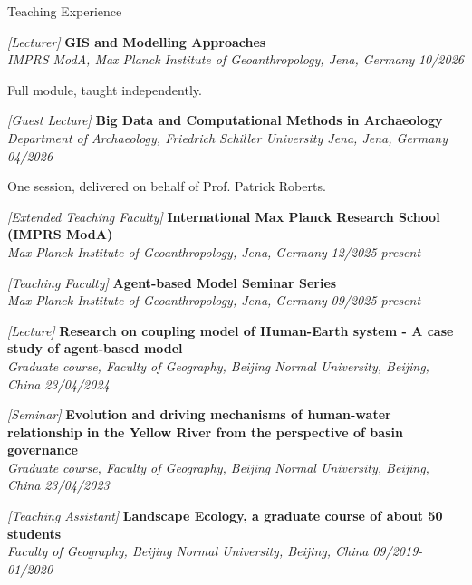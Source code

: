 \documentclass{resume} %
\newcommand{\projectentry}[4]{\textit{[#1]} {\bf #2} \\ \textnormal{\em #3} \hfill {\em #4}}
\begin{document}
\begin{rSection}{Teaching Experience}

    \projectentry{Lecturer}{GIS and Modelling Approaches}{IMPRS ModA, Max Planck Institute of Geoanthropology, Jena, Germany}{10/2026}

    Full module, taught independently.

    \projectentry{Guest Lecture}{Big Data and Computational Methods in Archaeology}{Department of Archaeology, Friedrich Schiller University Jena, Jena, Germany}{04/2026}

    One session, delivered on behalf of Prof. Patrick Roberts.

    \projectentry{Extended Teaching Faculty}{International Max Planck Research School (IMPRS ModA)}{Max Planck Institute of Geoanthropology, Jena, Germany}{12/2025-present}

    \projectentry{Teaching Faculty}{Agent-based Model Seminar Series}{Max Planck Institute of Geoanthropology, Jena, Germany}{09/2025-present}

    \projectentry{Lecture}{Research on coupling model of Human-Earth system - A case study of agent-based model}{Graduate course, Faculty of Geography, Beijing Normal University, Beijing, China}{23/04/2024}

    \projectentry{Seminar}{Evolution and driving mechanisms of human-water relationship in the Yellow River from the perspective of basin governance}{Graduate course, Faculty of Geography, Beijing Normal University, Beijing, China}{23/04/2023}

    \projectentry{Teaching Assistant}{Landscape Ecology, a graduate course of about 50 students}{Faculty of Geography, Beijing Normal University, Beijing, China}{09/2019-01/2020}


\end{rSection}
\end{document}
